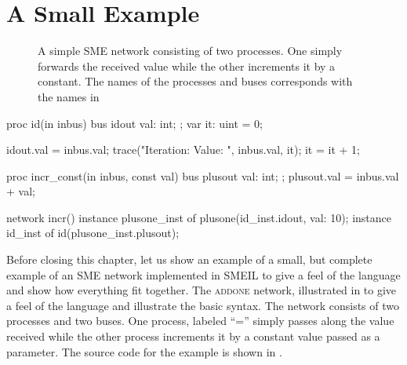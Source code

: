 \section{A Small Example}
\label{sec:smeilex}
\begin{figure}
  \centering
    \caption{A simple SME network consisting of two processes. One simply
      forwards the received value while the other increments it by a
      constant. The names of the processes and buses corresponds with the names
      in }
  \label{fig:addone}
\end{figure}
\begin{widefigure}
\begin{smeilcode2}
proc id(in inbus)
  bus idout {
    val: int;
  };
  var it: uint = 0;
{
  idout.val = inbus.val;
  trace("Iteration: {} Value: {}",
    inbus.val, it);
  it = it + 1;

}



proc incr_const(in inbus, const val)
  bus plusout {
     val: int;
  };
{
  plusout.val = inbus.val + val;
}

network incr() {
  instance plusone_inst of
    plusone(id_inst.idout, val: 10);
  instance id_inst of
    id(plusone_inst.plusout);
}
\end{smeilcode2}
\caption{An example program written in SMEIL.}
\label{fig:addone.sme}
\end{widefigure}

Before closing this chapter, let us show an example of a small, but complete
example of an SME network implemented in SMEIL to give a feel of the language
and show how everything fit together. The \textsc{addone} network,
illustrated in  to give a feel of the language and illustrate
the basic syntax. The network consists of two processes and two buses. One
process, labeled ``='' simply passes along the value received while the other
process increments it by a constant value passed as a parameter. The source code
for the example is shown in .

